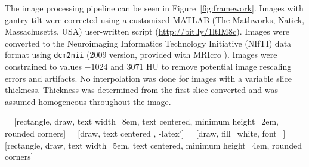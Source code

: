 \documentclass{elsarticle}\usepackage[]{graphicx}\usepackage[]{color}
\begin{document}
The image processing pipeline can be seen in Figure~\ref{fig:framework}.
Images with gantry tilt were corrected using a customized MATLAB (The Mathworks, Natick, Massachusetts, USA) user-written script (\url{http://bit.ly/1ltIM8c}). 
Images were converted to the Neuroimaging Informatics Technology Initiative (NIfTI) data format using \texttt{dcm2nii} (2009 version, provided with MRIcro \citep{rorden_stereotaxic_2000}).  Images were constrained to values $-1024$ and $3071$ HU to remove potential image rescaling errors and artifacts.  No interpolation was done for images with a variable slice thickness. Thickness was determined from the first slice converted and was assumed homogeneous throughout the image.  


 = [rectangle, draw, text width=8em, text centered, minimum height=2em, rounded corners]
 = [draw, text centered , -latex']
 = [draw, fill=white, font=\tiny ]
 = [rectangle, draw, text width=5em, text centered, minimum height=4em, rounded corners]    
\end{document}
